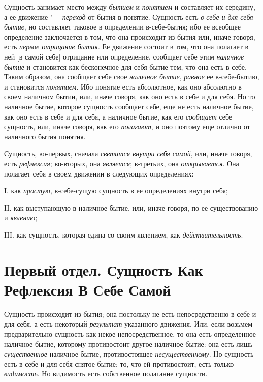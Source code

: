 Сущность занимает место между {\em бытием} и
{\em понятием} и составляет их середину, а ее движение
"--- {\em переход} от бытия в понятие. Сущность есть
{\em в-себе-и-для-себя-бытие}, но составляет таковое в
определении в-себе-бытия; ибо ее всеобщее определение заключается в том,
что она происходит из бытия или, иначе говоря, есть
{\em первое отрицание бытия}. Ее движение состоит в
том, что она полагает в ней [в самой себе] отрицание или определение,
сообщает себе этим {\em наличное бытие} и становится
как бесконечное для-себя-бытие тем, что она есть в себе. Таким образом, она
сообщает себе свое {\em наличное бытие},
{\em равное} ее в-себе-бытию, и становится
{\em понятием}. Ибо понятие есть абсолютное, как оно
абсолютно в своем наличном бытии, или, иначе говоря, как оно есть в себе и
для себя. Но то наличное бытие, которое сущность сообщает себе, еще не есть
наличное бытие, как оно есть в себе и для себя, а наличное бытие, как его
{\em сообщает} себе сущность, или, иначе говоря, как
его {\em полагают}, и оно поэтому еще отлично от
наличного бытия понятия.

Сущность, во-первых, сначала {\em светится внутри себя
самой}, или, иначе говоря, есть {\em рефлексия};
во-вторых, она {\em является}; в-третьих, она
{\em открывается}. Она полагает себя в своем движении в
следующих определениях:

I. как {\em простую}, в-себе-сущую сущность в ее
определениях внутри себя;

II. как выступающую в наличное бытие, или, иначе говоря, по ее существованию
и {\em явлению};

III. как сущность, которая едина со своим явлением, как {\em действительность}.

\clearpage
\part[{\em Первый отдел} \\ СУЩНОСТЬ КАК РЕФЛЕКСИЯ В СЕБЕ САМОЙ]{Первый отдел. Сущность Как Рефлексия В Себе Самой}
Сущность происходит из бытия; она постольку не
есть непосредственно в себе и для себя, а есть некоторый
{\em результат} указанного движения. Или, если возьмем
предварительно сущность как некое непосредственное, то она есть
определенное наличное бытие, которому противостоит другое наличное бытие:
она есть лишь {\em существенное} наличное бытие,
противостоящее {\em несущественному}. Но сущность есть
в себе и для себя снятое бытие; то, что ей противостоит, есть только
{\em видимость}. Но видимость есть собственное полагание сущности.

